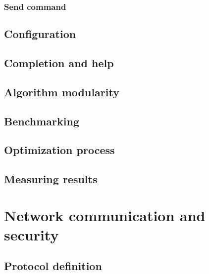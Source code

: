 \subsection{Send command}
\label{sec:cmd_app_send}


\section{Configuration}
\label{sec:cmd_config}


\section{Completion and help}
\label{sec:cmd_help}


\section{Algorithm modularity}
\label{sec:algs_modularity}


\section{Benchmarking}
\label{sec:cmd_benchmark}


\section{Optimization process}
\label{sec:optimizing}


\section{Measuring results}
\label{sec:lattice_performance_measuring}


\chapter{Network communication and security}
\label{ch:network_com_sec}


\section{Protocol definition}
\label{sec:protocol_def}



